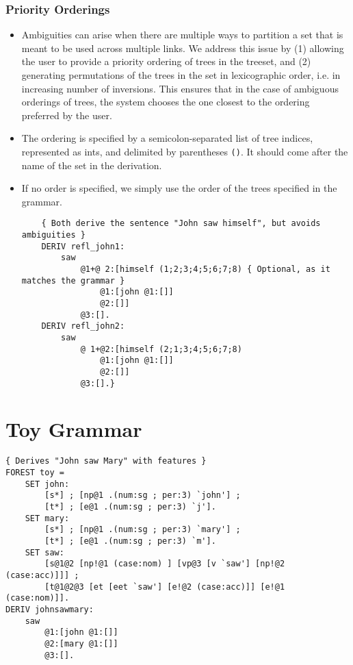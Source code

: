 \documentclass[10.5pt]{article}
\newcommand{\code}[1]{\texttt{#1}}
\begin{document}
\subsubsection{Priority Orderings}
  \begin{itemize}
	\item Ambiguities can arise when there are multiple ways to partition a set that is meant to be used across multiple links. We address this issue by (1) allowing the user to provide a priority ordering of trees in the treeset, and (2) generating permutations of the trees in the set in lexicographic order, i.e. in increasing number of inversions. This ensures that in the case of ambiguous orderings of trees, the system chooses the one closest to the ordering preferred by the user.
	\item The ordering is specified by a semicolon-separated list of tree indices, represented as ints, and delimited by parentheses \code{()}. It should come after the name of the set in the derivation.
	\item If no order is specified, we simply use the order of the trees specified in the grammar.
	
	\begin{mdframed}[backgroundcolor=blue!5] 
	\begin{verbatim}
	{ Both derive the sentence "John saw himself", but avoids ambiguities }
	DERIV refl_john1:
	    saw
	        @1+@￼2:[himself (1;2;3;4;5;6;7;8) { Optional, as it matches the grammar }
	            @1:[john @1:[]]
	            @2:[]]
	        @3:[].
	DERIV refl_john2:
	    saw
	        @￼1+@2:[himself (2;1;3;4;5;6;7;8)
	            @1:[john @1:[]]
	            @2:[]]
	        @3:[].}
	\end{verbatim}
	\end{mdframed}
  \end{itemize}

\section{Toy Grammar} 

\begin{mdframed}[backgroundcolor=blue!5] 
\begin{verbatim}
{ Derives "John saw Mary" with features }
FOREST toy =
    SET john:
        [s*] ; [np@1 .(num:sg ; per:3) `john'] ;
        [t*] ; [e@1 .(num:sg ; per:3) `j'].
    SET mary:
        [s*] ; [np@1 .(num:sg ; per:3) `mary'] ;
        [t*] ; [e@1 .(num:sg ; per:3) `m'].
    SET saw:
        [s@1@2 [np!@1 (case:nom) ] [vp@3 [v `saw'] [np!@2 (case:acc)]]] ;
        [t@1@2@3 [et [eet `saw'] [e!@2 (case:acc)]] [e!@1 (case:nom)]].
DERIV johnsawmary:
    saw
        @1:[john @1:[]]
        @2:[mary @1:[]]
        @3:[].
\end{verbatim}
\end{mdframed}
\end{document}

